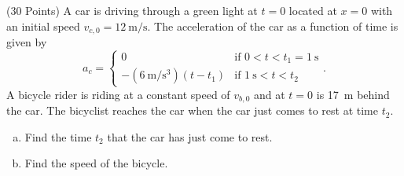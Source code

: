 \documentclass{esg8012exam}
\begin{document}
\begin{problem}{(30 Points)}
  A car is driving through a green light at $t = 0$ located at $x = 0$ with an initial speed $v_{c, 0} = \SI{12}{\meter\per\second}$.  The acceleration of the car as a function of time is given by
  $$a_c = \begin{cases}
            0 & \text{if }0 < t < t_1 = \SI{1}{\second} \\
            -(\SI{6}{\meter\per\second\cubed})(t - t_1) & \text{if }\SI{1}{\second} < t < t_2
          \end{cases}
  .$$
  A bicycle rider is riding at a constant speed of $v_{b,0}$ and at $t = 0$ is \SI{17}{\meter} behind the car.  The bicyclist reaches the car when the car just comes to rest at time $t_2$.

  \begin{enumerate}[(a)]
    \item Find the time $t_2$ that the car has just come to rest.
    \item Find the speed of the bicycle.
  \end{enumerate}
\end{problem}
\end{document}
